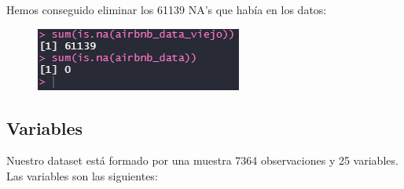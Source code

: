 \documentclass{article}
\begin{document}
Hemos conseguido eliminar los 61139 NA's que había en los datos:
\vspace{0.45cm}
\begin{figure}[h]
\hspace*{-0.25cm}
\centering
\includegraphics[scale = 0.7]{nas_eliminados}
\end{figure}

\clearpage
\subsection{Variables}
Nuestro dataset está formado por una muestra 7364 observaciones y 25 variables. Las variables son las siguientes:
\end{document}
